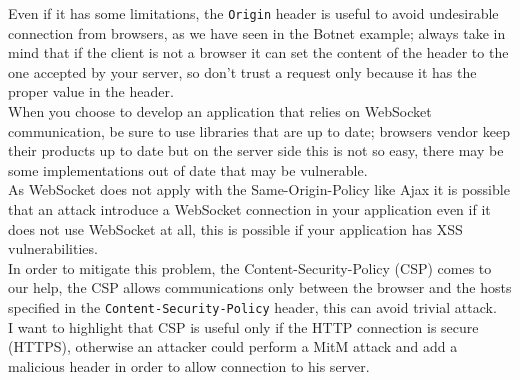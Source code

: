 	Even if it has some limitations, the \texttt{Origin} header is useful to avoid undesirable connection from browsers, as we have seen in the Botnet example; always take in
	mind that if the client is not a browser it can set the content of the header to the one accepted by your server, so don't trust a request only because it has the proper
	value in the header.\\
	
	When you choose to develop an application that relies on WebSocket communication, be sure to use libraries that are up to date; browsers vendor keep their products up to date
	but on the server side this is not so easy, there may be some implementations out of date that may be vulnerable.\\
	
	As WebSocket does not apply with the Same-Origin-Policy like Ajax it is possible that an attack introduce a WebSocket connection in your application even if it
	does not use WebSocket at all, this is possible if your application has XSS vulnerabilities.\\
	In order to mitigate this problem, the Content-Security-Policy (CSP) comes to our help, the CSP allows communications only between the browser and the hosts specified in the
	\texttt{Content-Security-Policy} header, this can avoid trivial attack.\\
	I want to highlight that CSP is useful only if the HTTP connection is secure (HTTPS), otherwise an attacker could perform a MitM attack and add a malicious header in order to allow
	connection to his server.\\
	